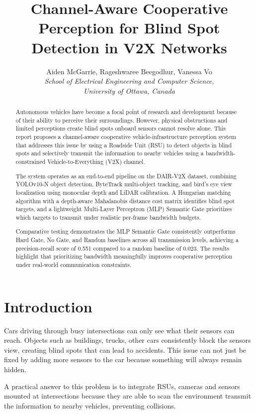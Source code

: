 \documentclass[12pt]{article}
\title{\textbf{Channel-Aware Cooperative Perception for Blind Spot Detection in V2X Networks}}
\author{Aiden McGarrie, Rageshwaree Beegodhur, Vanessa Vo \\ \textit{School of Electrical Engineering and Computer Science,} \\ \textit{University of Ottawa, Canada}}
\date{}
\begin{document}
\maketitle

\begin{abstract}
\noindent
Autonomous vehicles have become a focal point of research and development because of their ability to perceive their surroundings. However, physical obstructions and limited perceptions create blind spots onboard sensors cannot resolve alone. This report proposes a channel-aware cooperative vehicle-infrastructure perception system that addresses this issue by using a Roadside Unit (RSU) to detect objects in blind spots and selectively transmit the information to nearby vehicles using a bandwidth-constrained Vehicle-to-Everything (V2X) channel.

\medskip
\noindent
The system operates as an end-to-end pipeline on the DAIR-V2X dataset, combining YOLOv10-N object detection, ByteTrack multi-object tracking, and bird's eye view localization using monocular depth and LiDAR calibration. A Hungarian matching algorithm with a depth-aware Mahalanobis distance cost matrix identifies blind spot targets, and a lightweight Multi-Layer Perceptron (MLP) Semantic Gate prioritizes which targets to transmit under realistic per-frame bandwidth budgets.

\medskip
\noindent
Comparative testing demonstrates the MLP Semantic Gate consistently outperforms Hard Gate, No Gate, and Random baselines across all transmission levels, achieving a precision-recall score of 0.551 compared to a random baseline of 0.023. The results highlight that prioritizing bandwidth meaningfully improves cooperative perception under real-world communication constraints.
\end{abstract}

\newpage
\tableofcontents
\newpage

\section{Introduction}
Cars driving through busy intersections can only see what their sensors can reach. Objects such as buildings, trucks, other cars consistently block the sensors view, creating blind spots that can lead to accidents. This issue can not just be fixed by adding more sensors to the car because something will always remain hidden. 

\medskip
A practical answer to this problem is to integrate RSUs, cameras and sensors mounted at intersections because they are able to scan the environment transmit the information to nearby vehicles, preventing collisions. 
\end{document}

